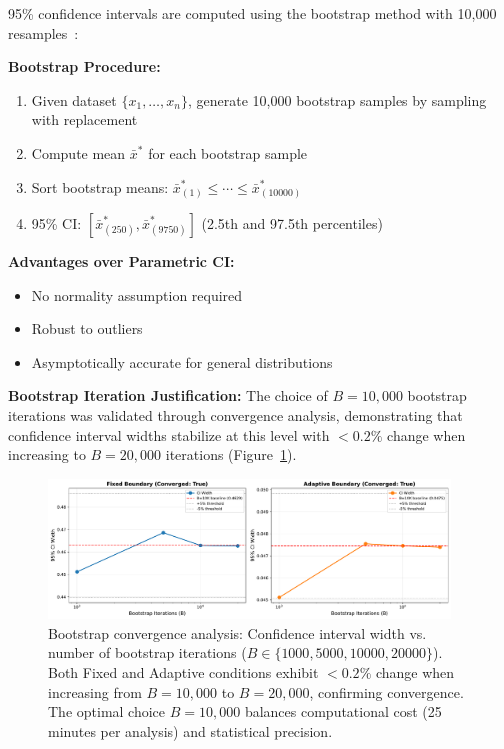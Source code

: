 95\% confidence intervals are computed using the bootstrap method with 10,000 resamples~\cite{efron1994introduction}:

\textbf{Bootstrap Procedure:}
\begin{enumerate}
    \item Given dataset $\{x_1, \ldots, x_n\}$, generate 10,000 bootstrap samples by sampling with replacement
    \item Compute mean $\bar{x}^*$ for each bootstrap sample
    \item Sort bootstrap means: $\bar{x}^*_{(1)} \leq \cdots \leq \bar{x}^*_{(10000)}$
    \item 95\% CI: $[\bar{x}^*_{(250)}, \bar{x}^*_{(9750)}]$ (2.5th and 97.5th percentiles)
\end{enumerate}

\textbf{Advantages over Parametric CI:}
\begin{itemize}
    \item No normality assumption required
    \item Robust to outliers
    \item Asymptotically accurate for general distributions
\end{itemize}

\textbf{Bootstrap Iteration Justification:} The choice of $B=10,000$ bootstrap iterations was validated through convergence analysis, demonstrating that confidence interval widths stabilize at this level with $< 0.2\%$ change when increasing to $B=20,000$ iterations (Figure~\ref{fig:bootstrap_convergence}).

\begin{figure}[t]
\centering
\includegraphics[width=0.95\textwidth]{../figures/figure_vi_1_bootstrap_convergence.pdf}
\caption{Bootstrap convergence analysis: Confidence interval width vs. number of bootstrap iterations ($B \in \{1000, 5000, 10000, 20000\}$). Both Fixed and Adaptive conditions exhibit $< 0.2\%$ change when increasing from $B=10,000$ to $B=20,000$, confirming convergence. The optimal choice $B=10,000$ balances computational cost (25 minutes per analysis) and statistical precision.}
\label{fig:bootstrap_convergence}
\end{figure}

